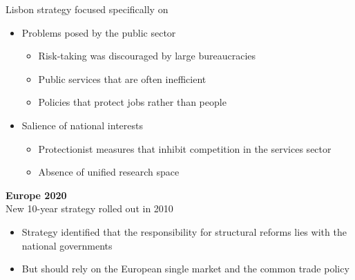 \documentclass{beamer}
\begin{document}
\begin{frame}
  Lisbon strategy focused specifically on 
  \begin{itemize}
  \item Problems posed by the public sector
  \begin{itemize}
    \item Risk-taking was discouraged by large bureaucracies
    \item Public services that are often inefficient
    \item Policies that protect jobs rather than people
  \end{itemize}
  \item Salience of national interests
  \begin{itemize}
    \item Protectionist measures that inhibit competition in the services sector
    \item Absence of unified research space
  \end{itemize}
\end{itemize}
\end{frame}

\begin{frame}
  \textbf{Europe 2020}\\
  New 10-year strategy rolled out in 2010
  \begin{itemize}
    \item Strategy identified that the responsibility for structural reforms lies with the national governments 
    \item But should rely on the European single market and the common trade policy
  \end{itemize}  
\end{frame}
\end{document}
